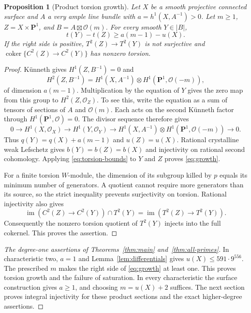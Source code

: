 \documentclass[11pt,a4paper]{article}
\newcommand{\OO}{\mathcal O}
\newcommand{\PP}{\mathbf P}
\newcommand{\coker}{\operatorname{coker}}
\newtheorem{proposition}[theorem]{Proposition}
\theoremstyle{definition}\newtheorem{definition}[theorem]{Definition}
\theoremstyle{remark}\newtheorem{remark}[theorem]{Remark}
\numberwithin{equation}{section}
\begin{document}
\begin{proposition}[Product torsion growth]\label{prop:product-growth}
Let $X$ be a smooth projective connected surface and $A$ a very ample line bundle with $a=h^1(X,A^{-1})>0$. Let $m\ge1$, $Z=X\times\PP^1$, and $B=A\boxtimes\OO(m)$. For every smooth $Y\in|B|$,
\begin{equation}\label{eq:growth}
 t(Y)-t(Z)\ge a(m-1)-u(X).
\end{equation}
If the right side is positive, $T^2(Z)\to T^2(Y)$ is not surjective and $\coker\{C^2(Z)\to C^2(Y)\}$ has nonzero torsion.
\end{proposition}
\begin{proof}
Künneth gives $H^1(Z,B^{-1})=0$ and
\[
 H^2(Z,B^{-1})=H^1(X,A^{-1})\otimes H^1(\PP^1,\OO(-m)),
\]
of dimension $a(m-1)$. Multiplication by the equation of $Y$ gives the zero map from this group to $H^2(Z,\OO_Z)$. To see this, write the equation as a sum of tensors of sections of $A$ and $\OO(m)$. Each acts on the second Künneth factor through $H^1(\PP^1,\OO)=0$. The divisor sequence therefore gives
\[
 0\to H^1(X,\OO_X)\to H^1(Y,\OO_Y)
 \to H^1(X,A^{-1})\otimes H^1(\PP^1,\OO(-m))\to0.
\]
Thus $q(Y)=q(X)+a(m-1)$ and $u(Z)=u(X)$. Rational crystalline weak Lefschetz gives $b(Y)=b(Z)=b(X)$ and injectivity on rational second cohomology. Applying \eqref{eq:torsion-bounds} to $Y$ and $Z$ proves \eqref{eq:growth}.

For a finite torsion $W$-module, the dimension of its subgroup killed by $p$ equals its minimum number of generators. A quotient cannot require more generators than its source, so the strict inequality prevents surjectivity on torsion. Rational injectivity also gives
\[
 \operatorname{im}(C^2(Z)\to C^2(Y))\cap T^2(Y)
       =\operatorname{im}(T^2(Z)\to T^2(Y)).
\]
Consequently the nonzero torsion quotient of $T^2(Y)$ injects into the full cokernel. This proves the assertion.
\end{proof}

\begin{proof}[The degree-one assertions of Theorems~\ref{thm:main} and~\ref{thm:all-primes}]
In characteristic two, $a=1$ and Lemma~\ref{lem:differentials} gives $u(X)\le591\cdot9^{556}$. The prescribed $m$ makes the right side of \eqref{eq:growth} at least one. This proves torsion growth and the failure of saturation. In every characteristic the surface construction gives $a\ge1$, and choosing $m=u(X)+2$ suffices. The next section proves integral injectivity for these product sections and the exact higher-degree assertions.
\end{proof}
\end{document}
